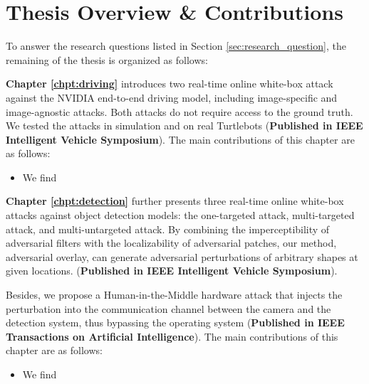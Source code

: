 
\section{Thesis Overview \& Contributions}

To answer the research questions listed in Section \ref{sec:research_question}, the remaining of the thesis is organized as follows:

\vspace{0.5cm}



\noindent \textbf{Chapter \ref{chpt:driving}} introduces two real-time online white-box attack against the NVIDIA end-to-end driving model, including image-specific and image-agnostic attacks. Both attacks do not require access to the ground truth. We tested the attacks in simulation and on real Turtlebots (\textbf{Published in IEEE Intelligent Vehicle Symposium}). The main contributions of this chapter are as follows:

\begin{itemize}
    \item We find
\end{itemize}

\vspace{0.5cm}

\noindent \textbf{Chapter \ref{chpt:detection}} further presents three real-time online white-box attacks against object detection models: the one-targeted attack, multi-targeted attack, and multi-untargeted attack. By combining the imperceptibility of adversarial filters with the localizability of adversarial patches, our method, adversarial overlay, can generate adversarial perturbations of arbitrary shapes at given locations. (\textbf{Published in IEEE Intelligent Vehicle Symposium}). 

Besides, we propose a Human-in-the-Middle hardware attack that injects the perturbation into the communication channel between the camera and the detection system, thus bypassing the operating system (\textbf{Published in IEEE Transactions on Artificial Intelligence}). The main contributions of this chapter are as follows:
\begin{itemize}
    \item We find
\end{itemize}

